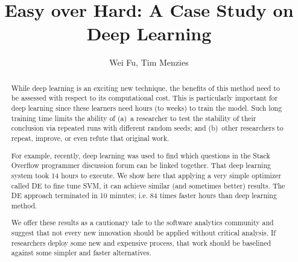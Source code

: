 \documentclass[sigconf]{acmart}
\theoremstyle{break}
\begin{document}
 
\title{Easy over Hard: A Case Study on Deep Learning}


\author{Wei Fu,  Tim Menzies}

 
\begin{abstract}
While deep learning is an exciting new technique, the benefits of this
method need to be  assessed with respect to its computational cost. 
This is particularly important for deep learning since these learners need 
 hours (to  weeks) to train the model.
Such long training time limits the ability
of (a)~a researcher to test
the stability of their conclusion
via repeated runs with different random seeds;
and (b)~other researchers to repeat, improve, or even refute that original work.

For example, recently, deep learning
was used to  find which
questions  in the Stack Overflow programmer discussion
forum can be linked together. That deep learning system
took 14 hours to execute.
We show here that applying a very simple optimizer called DE to fine tune SVM, it can achieve  similar (and sometimes better) results. The DE approach  terminated in 10 minutes;
i.e. 84 times faster 
hours than  deep learning method.

We offer these results as a cautionary tale to the software analytics community and suggest that not
every new innovation should be applied without critical analysis. If researchers deploy some new and expensive process, that work should be baselined against some simpler and faster alternatives.

\end{abstract}
\end{document}
